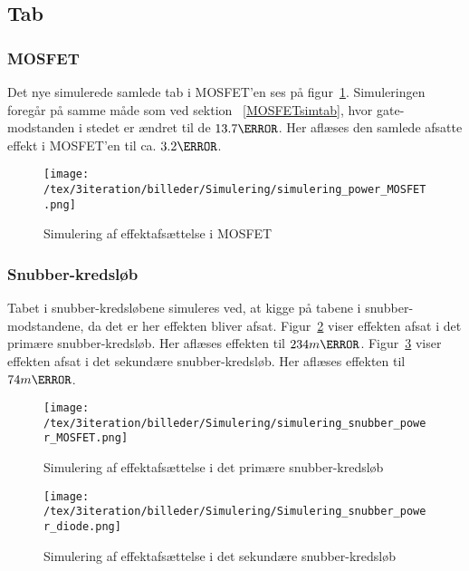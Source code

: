 \subsection{Tab}

\subsubsection{MOSFET}
\noindent Det nye simulerede samlede tab i MOSFET'en ses på figur~\ref{fig:simulering_power_MOSFET}. Simuleringen foregår på samme måde som ved sektion ~\ref{MOSFETsimtab}, hvor gate-modstanden i stedet er ændret til de $13.7\ohm$. Her aflæses den samlede afsatte effekt i MOSFET'en til ca. $3.2\watt$. 

\begin{figure}[H]
	\center
	\texttt{[image: /tex/3iteration/billeder/Simulering/simulering\_power\_MOSFET.png]}
	\caption{Simulering af effektafsættelse i MOSFET}
	\label{fig:simulering_power_MOSFET}
\end{figure}

\subsubsection{Snubber-kredsløb}
\noindent Tabet i snubber-kredsløbene simuleres ved, at kigge på tabene i snubber-modstandene, da det er her effekten bliver afsat. Figur~\ref{fig:simulering_power_snubber_MOSFET} viser effekten afsat i det primære snubber-kredsløb. Her aflæses effekten til $234m\watt$. Figur~\ref{fig:simulering_power_snubber_diode} viser effekten afsat i det sekundære snubber-kredsløb. Her aflæses effekten til $74m\watt$. 

\begin{figure}[H]
	\center
	\texttt{[image: /tex/3iteration/billeder/Simulering/simulering\_snubber\_power\_MOSFET.png]}
	\caption{Simulering af effektafsættelse i det primære snubber-kredsløb}
	\label{fig:simulering_power_snubber_MOSFET}
\end{figure}

\begin{figure}[H]
	\center
	\texttt{[image: /tex/3iteration/billeder/Simulering/Simulering\_snubber\_power\_diode.png]}
	\caption{Simulering af effektafsættelse i det sekundære snubber-kredsløb}
	\label{fig:simulering_power_snubber_diode}
\end{figure}

